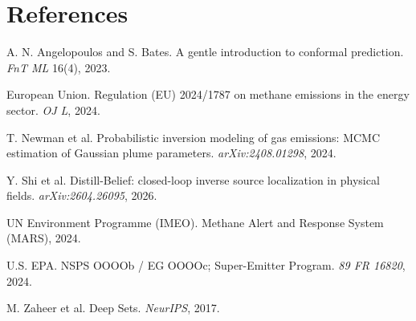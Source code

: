 \documentclass{article}
\begin{document}
\section*{References}
{\small
\begin{list}{}{\setlength{\leftmargin}{1.4em}\setlength{\itemindent}{-1.4em}\setlength{\itemsep}{1.5pt}}
\item A. N. Angelopoulos and S. Bates. A gentle introduction to conformal prediction. \emph{FnT ML} 16(4), 2023.
\item European Union. Regulation (EU) 2024/1787 on methane emissions in the energy sector. \emph{OJ L}, 2024.
\item T. Newman et al. Probabilistic inversion modeling of gas emissions: MCMC estimation of Gaussian plume parameters. \emph{arXiv:2408.01298}, 2024.
\item Y. Shi et al. Distill-Belief: closed-loop inverse source localization in physical fields. \emph{arXiv:2604.26095}, 2026.
\item UN Environment Programme (IMEO). Methane Alert and Response System (MARS), 2024.
\item U.S. EPA. NSPS OOOOb / EG OOOOc; Super-Emitter Program. \emph{89 FR 16820}, 2024.
\item M. Zaheer et al. Deep Sets. \emph{NeurIPS}, 2017.
\end{list}}
\end{document}

